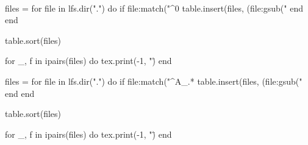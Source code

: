 \documentclass[fleqn, 11pt]{tools/mc}
\title{\TITLE \\ \COURSECODE \\ \ACADEMICYEAR}
\author{\AUTHOR}
\begin{document}

\titlepage
\tableofcontents
\printnomenclature


\begin{luacode*}
  files = {}
  for file in lfs.dir(".") do
  if file:match("^0%
      table.insert(files, (file:gsub("%
    end
  end

  table.sort(files)

  for _, f in ipairs(files) do
    tex.print(-1, "\")
  end

\end{luacode*}

\appendix

\begin{luacode}
  files = {}
  for file in lfs.dir(".") do
    if file:match("^A_.*%
      table.insert(files, (file:gsub("%
    end
  end

  table.sort(files)

  for _, f in ipairs(files) do
    tex.print(-1, "\")
  end
\end{luacode}


\printindex 
\end{document}
